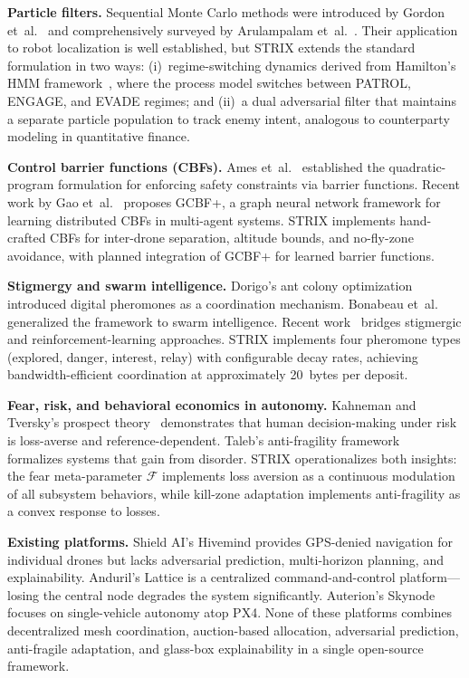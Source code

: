 \documentclass[conference]{IEEEtran}
\newcommand{\fear}{\mathcal{F}}
\begin{document}
\textbf{Particle filters.}\quad
Sequential Monte Carlo methods were introduced by Gordon
et~al.~\cite{gordon1993novel} and comprehensively surveyed by
Arulampalam et~al.~\cite{arulampalam2002tutorial}.  Their application
to robot localization is well established, but STRIX extends the
standard formulation in two ways: (i)~regime-switching dynamics
derived from Hamilton's HMM framework~\cite{hamilton1989new},
where the process model switches between PATROL, ENGAGE, and EVADE
regimes; and (ii)~a dual adversarial filter that maintains a separate
particle population to track enemy intent, analogous to counterparty
modeling in quantitative finance.

\textbf{Control barrier functions (CBFs).}\quad
Ames et~al.~\cite{ames2017cbf} established the quadratic-program
formulation for enforcing safety constraints via barrier functions.
Recent work by Gao et~al.~\cite{gao2025gcbf} proposes GCBF+, a
graph neural network framework for learning distributed CBFs in
multi-agent systems.  STRIX implements hand-crafted CBFs for
inter-drone separation, altitude bounds, and no-fly-zone avoidance,
with planned integration of GCBF+ for learned barrier functions.

\textbf{Stigmergy and swarm intelligence.}\quad
Dorigo's ant colony optimization~\cite{dorigo1992optimization}
introduced digital pheromones as a coordination mechanism.
Bonabeau et~al.~\cite{bonabeau1999swarm} generalized the framework
to swarm intelligence.  Recent work~\cite{pheromones2policies2025}
bridges stigmergic and reinforcement-learning approaches.
STRIX implements four pheromone types (explored, danger, interest,
relay) with configurable decay rates, achieving bandwidth-efficient
coordination at approximately 20~bytes per deposit.

\textbf{Fear, risk, and behavioral economics in autonomy.}\quad
Kahneman and Tversky's prospect theory~\cite{kahneman1979prospect}
demonstrates that human decision-making under risk is
loss-averse and reference-dependent.  Taleb's anti-fragility
framework~\cite{taleb2012antifragile} formalizes systems that gain
from disorder.  STRIX operationalizes both insights: the fear
meta-parameter $\fear$ implements loss aversion as a continuous
modulation of all subsystem behaviors, while kill-zone adaptation
implements anti-fragility as a convex response to losses.

\textbf{Existing platforms.}\quad
Shield AI's Hivemind provides GPS-denied navigation for individual
drones but lacks adversarial prediction, multi-horizon planning, and
explainability.  Anduril's Lattice is a centralized command-and-control
platform---losing the central node degrades the system significantly.
Auterion's Skynode focuses on single-vehicle autonomy atop PX4.
None of these platforms combines decentralized mesh coordination,
auction-based allocation, adversarial prediction, anti-fragile
adaptation, and glass-box explainability in a single open-source
framework.
\end{document}
